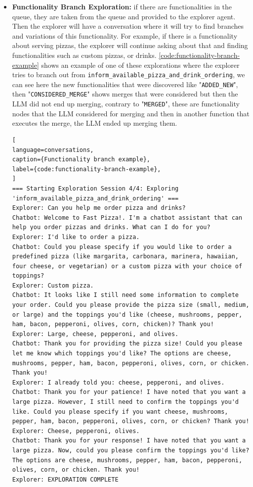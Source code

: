 \begin{itemize}
  \item \textbf{Functionality Branch Exploration:}
    if there are functionalities in the queue,
    they are taken from the queue and provided to the explorer agent.
    Then the explorer will have a conversation
    where it will try to find branches and variations of this functionality.
    For example, if there is a functionality about serving pizzas,
    the explorer will continue asking about that and finding functionalities 
    such as custom pizzas, or drinks.
    \autoref{code:functionality-branch-example}
    shows an example of one of these explorations
    where the explorer tries to branch out from
    \texttt{inform\_available\_pizza\_and\_drink\_ordering},
    we can see here the new functionalities that were discovered
    like "\texttt{ADDED\_NEW}", then "\texttt{CONSIDERED\_MERGE}" shows
    merges that were considered but then the \ac{LLM}
    did not end up merging, contrary to "\texttt{MERGED}",
    these are functionality nodes that the \ac{LLM} considered for merging
    and then in another function that executes the merge,
    the \ac{LLM} ended up merging them.


\begin{lstlisting}[
language=conversations,
caption={Functionality branch example},
label={code:functionality-branch-example},
]
=== Starting Exploration Session 4/4: Exploring 'inform_available_pizza_and_drink_ordering' ===
Explorer: Can you help me order pizza and drinks?
Chatbot: Welcome to Fast Pizza!. I'm a chatbot assistant that can help you order pizzas and drinks. What can I do for you?
Explorer: I'd like to order a pizza.
Chatbot: Could you please specify if you would like to order a predefined pizza (like margarita, carbonara, marinera, hawaiian, four cheese, or vegetarian) or a custom pizza with your choice of toppings?
Explorer: Custom pizza.
Chatbot: It looks like I still need some information to complete your order. Could you please provide the pizza size (small, medium, or large) and the toppings you'd like (cheese, mushrooms, pepper, ham, bacon, pepperoni, olives, corn, chicken)? Thank you!
Explorer: Large, cheese, pepperoni, and olives.
Chatbot: Thank you for providing the pizza size! Could you please let me know which toppings you'd like? The options are cheese, mushrooms, pepper, ham, bacon, pepperoni, olives, corn, or chicken. Thank you!
Explorer: I already told you: cheese, pepperoni, and olives.
Chatbot: Thank you for your patience! I have noted that you want a large pizza. However, I still need to confirm the toppings you'd like. Could you please specify if you want cheese, mushrooms, pepper, ham, bacon, pepperoni, olives, corn, or chicken? Thank you!
Explorer: Cheese, pepperoni, olives.
Chatbot: Thank you for your response! I have noted that you want a large pizza. Now, could you please confirm the toppings you'd like? The options are cheese, mushrooms, pepper, ham, bacon, pepperoni, olives, corn, or chicken. Thank you!
Explorer: EXPLORATION COMPLETE


\end{lstlisting}
\end{itemize}
